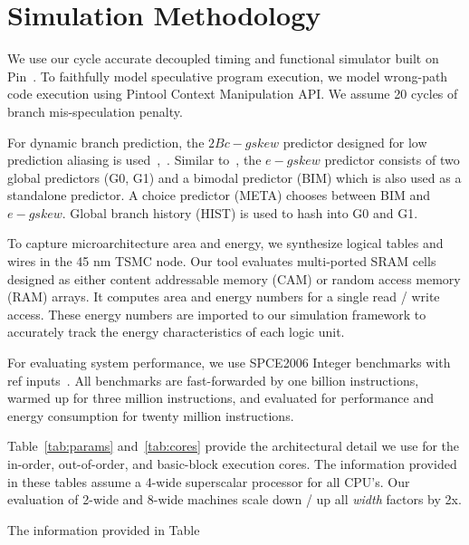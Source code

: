 \section{Simulation Methodology}
\label{sec:simulation}

We use our cycle accurate decoupled timing and functional simulator built on
Pin~\cite{pin}. To faithfully model speculative program execution,  we model
wrong-path code execution using Pintool Context Manipulation API. We assume 20
cycles of branch mis-speculation penalty.

For dynamic branch prediction, the $2Bc{-}gskew$ predictor designed for low
prediction aliasing is used~\cite{ref:seznec1999aliased},~\cite{ref:EV8}.
Similar to~\cite{ref:EV8}, the $e{-}gskew$ predictor consists of two global
predictors (G0, G1) and a bimodal predictor (BIM) which is also used as a
standalone predictor. A choice predictor (META) chooses between BIM and
$e{-}gskew$. Global branch history (HIST) is used to hash into G0 and G1.

To capture microarchitecture area and energy, we synthesize logical tables and
wires in the 45 nm TSMC node. Our tool evaluates multi-ported SRAM cells
designed as either content addressable memory (CAM) or random access memory
(RAM) arrays.  It computes area and energy numbers for a single read / write
access. These energy numbers are imported to our simulation framework to
accurately track the energy characteristics of each logic unit.

For evaluating system performance, we use SPCE2006 Integer benchmarks with ref
inputs~\cite{spec}. All benchmarks are fast-forwarded by one billion
instructions, warmed up for three million instructions, and evaluated for
performance and energy consumption for twenty million instructions.

Table~\ref{tab:params} and~\ref{tab:cores} provide the
architectural detail we use for the in-order, out-of-order, and basic-block
execution cores. The information provided in these tables assume a 4-wide
superscalar processor for all CPU's. Our evaluation of 2-wide and 8-wide
machines scale down / up all {\it{width}} factors by 2x.

The information provided in Table



